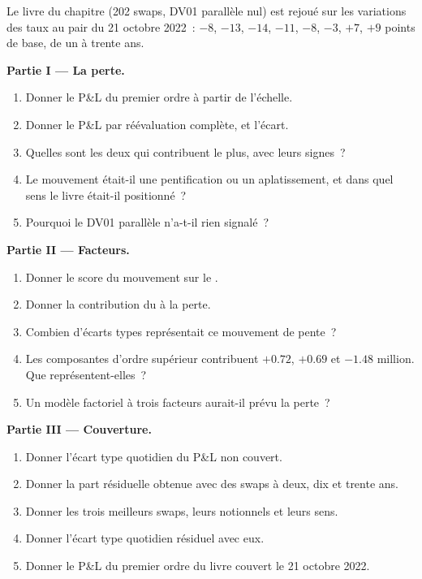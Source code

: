 \begin{problem}\label{pb:rc:rates-risk:1}
Le livre du chapitre (202 swaps, DV01 parallèle nul) est rejoué sur les variations des
taux au pair du 21 octobre 2022~: $-8$, $-13$, $-14$, $-11$, $-8$, $-3$, $+7$, $+9$
points de base, de un à trente ans.

\medskip\noindent\textbf{Partie I --- La perte.}
\begin{enumerate}
\item Donner le P\&L du premier ordre à partir de l'échelle.
\item Donner le P\&L par réévaluation complète, et l'écart.
\item Quelles sont les deux  qui contribuent le plus, avec leurs signes~?
\item Le mouvement était-il une pentification ou un aplatissement, et dans quel sens le livre
était-il positionné~?
\item Pourquoi le DV01 parallèle n'a-t-il rien signalé~?
\end{enumerate}

\medskip\noindent\textbf{Partie II --- Facteurs.}
\begin{enumerate}[resume]
\item Donner le score du mouvement sur le .
\item Donner la contribution du  à la perte.
\item Combien d'écarts types représentait ce mouvement de pente~?
\item Les composantes d'ordre supérieur contribuent $+0.72$, $+0.69$ et $-1.48$ million. Que
représentent-elles~?
\item Un modèle factoriel à trois facteurs aurait-il prévu la perte~?
\end{enumerate}

\medskip\noindent\textbf{Partie III --- Couverture.}
\begin{enumerate}[resume]
\item Donner l'écart type quotidien du P\&L non couvert.
\item Donner la part résiduelle obtenue avec des swaps à deux, dix et trente ans.
\item Donner les trois meilleurs swaps, leurs notionnels et leurs sens.
\item Donner l'écart type quotidien résiduel avec eux.
\item Donner le P\&L du premier ordre du livre couvert le 21 octobre 2022.
\end{enumerate}


\end{problem}
